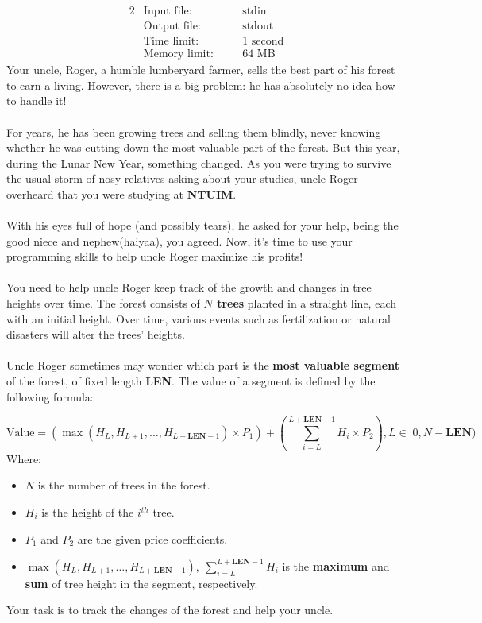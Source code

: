 \documentclass[12pt,a4paper]{article}
\begin{document}
\begin{alignat*} {2}
 &   \text{Input file:}   \quad     &&\text{stdin}\\
 &   \text{Output file:}  \quad     &&\text{stdout}\\
 &   \text{Time limit:}   \quad     &&\text{1 second}\\
 &   \text{Memory limit:} \quad     &&\text{64 MB}
\end{alignat*}
\noindent
Your uncle, Roger, a humble lumberyard farmer, sells the best part of his forest to earn a living. However, there is a big problem: he has absolutely no idea how to handle it! 
\\\\
\noindent
For years, he has been growing trees and selling them blindly, never knowing whether he was cutting down the most valuable part of the forest. But this year, during the Lunar New Year, something changed. As you were trying to survive the usual storm of nosy relatives asking about your studies, uncle Roger overheard that you were studying at \textbf{NTUIM}.  
\\\\
\noindent
With his eyes full of hope (and possibly tears), he asked for your help, being the good niece and nephew(haiyaa), you agreed. Now, it's time to use your programming skills to help uncle Roger maximize his profits!
\\\\
\noindent
You need to help uncle Roger keep track of the growth and changes in tree heights over time. The forest consists of \textbf{\(N\) trees} planted in a straight line, each with an initial height. Over time, various events such as fertilization or natural disasters will alter the trees' heights.
\\\\
\noindent
Uncle Roger sometimes may wonder which part is the \textbf{most valuable segment} of the forest, of fixed length \textbf{LEN}. The value of a segment is defined by the following formula:

\[
\text{Value} = (\max(H_L, H_{L+1}, \dots, H_{L+\textbf{LEN}-1}) \times P_1) + (\sum_{i=L}^{L+\textbf{LEN}-1} H_i \times P_2), L\in[0,N-\textbf{LEN})
\]
\noindent
Where:
\begin{itemize}
    \item \( N \) is the number of trees in the forest.
    \item \( H_i \) is the height of the \( i^{th} \) tree.
    \item \( P_1 \) and \( P_2 \) are the given price coefficients.
    \item \( \max(H_L, H_{L+1}, \dots, H_{L+\textbf{LEN}-1}),\ \sum_{i=L}^{L+\textbf{LEN}-1} H_i\) is the \textbf{maximum} and \textbf{sum} of tree height in the segment, respectively.
\end{itemize}
\noindent
Your task is to track the changes of the forest and help your uncle.
\end{document}
